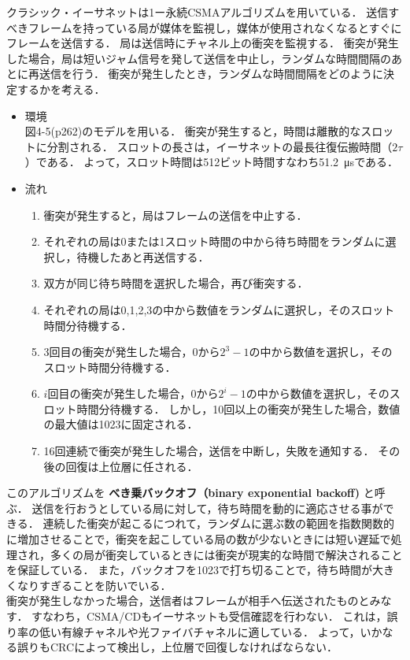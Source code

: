 \documentclass[a4paper]{ltjsarticle}
\begin{document}
クラシック・イーサネットは1ー永続CSMAアルゴリズムを用いている．
送信すべきフレームを持っている局が媒体を監視し，媒体が使用されなくなるとすぐにフレームを送信する．
局は送信時にチャネル上の衝突を監視する．
衝突が発生した場合，局は短いジャム信号を発して送信を中止し，ランダムな時間間隔のあとに再送信を行う．
衝突が発生したとき，ランダムな時間間隔をどのように決定するかを考える． 
\begin{itemize}
  \item 環境\\
    図4-5(p262)のモデルを用いる．
    衝突が発生すると，時間は離散的なスロットに分割される．
    スロットの長さは，イーサネットの最長往復伝搬時間（\(2\tau\)）である．
    よって，スロット時間は512ビット時間すなわち\SI{51.2}{\micro s}である． 
  \item 流れ
  
  \begin{enumerate}
    \item 衝突が発生すると，局はフレームの送信を中止する．
    \item それぞれの局は0または1スロット時間の中から待ち時間をランダムに選択し，待機したあと再送信する．
    \item 双方が同じ待ち時間を選択した場合，再び衝突する．
    \item それぞれの局は0,1,2,3の中から数値をランダムに選択し，そのスロット時間分待機する．
    \item 3回目の衝突が発生した場合，0から\(2^3 - 1\)の中から数値を選択し，そのスロット時間分待機する．
    \item \(i\)回目の衝突が発生した場合，0から\(2^i - 1\)の中から数値を選択し，そのスロット時間分待機する．
    しかし，10回以上の衝突が発生した場合，数値の最大値は1023に固定される．
    \item 16回連続で衝突が発生した場合，送信を中断し，失敗を通知する．
    その後の回復は上位層に任される．
  \end{enumerate}
\end{itemize}

  このアルゴリズムを \textbf{べき乗バックオフ（binary exponential backoff)} と呼ぶ．
  送信を行おうとしている局に対して，待ち時間を動的に適応させる事ができる．
  連続した衝突が起こるにつれて，ランダムに選ぶ数の範囲を指数関数的に増加させることで，衝突を起こしている局の数が少ないときには短い遅延で処理され，多くの局が衝突しているときには衝突が現実的な時間で解決されることを保証している．
  また，バックオフを1023で打ち切ることで，待ち時間が大きくなりすぎることを防いでいる．\\
  衝突が発生しなかった場合，送信者はフレームが相手へ伝送されたものとみなす．
  すなわち，CSMA/CDもイーサネットも受信確認を行わない．
  これは，誤り率の低い有線チャネルや光ファイバチャネルに適している．
  よって，いかなる誤りもCRCによって検出し，上位層で回復しなければならない．
 
\end{document}
